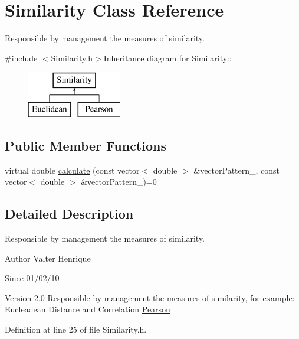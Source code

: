 \hypertarget{classSimilarity}{
\section{Similarity Class Reference}
\label{classSimilarity}
}


Responsible by management the measures of similarity.  


{\ttfamily \#include $<$Similarity.h$>$}Inheritance diagram for Similarity::\begin{figure}[H]
\begin{center}
\leavevmode
\includegraphics[height=2cm]{classSimilarity}
\end{center}
\end{figure}
\subsection*{Public Member Functions}
\begin{DoxyCompactItemize}
\item 
virtual double \hyperlink{classSimilarity_a3ff3d3622d8a45b15531bc143308b2ae}{calculate} (const vector$<$ double $>$ \&vectorPattern\_, const vector$<$ double $>$ \&vectorPattern\_)=0
\end{DoxyCompactItemize}


\subsection{Detailed Description}
Responsible by management the measures of similarity. \begin{DoxyAuthor}{Author}
Valter Henrique 
\end{DoxyAuthor}
\begin{DoxySince}{Since}
01/02/10 
\end{DoxySince}
\begin{DoxyVersion}{Version}
2.0 Responsible by management the measures of similarity, for example: Eucleadean Distance and Correlation \hyperlink{classPearson}{Pearson} 
\end{DoxyVersion}


Definition at line 25 of file Similarity.h.

